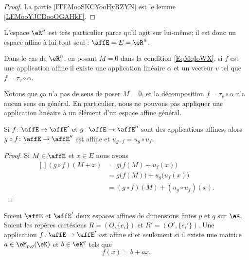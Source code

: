 \begin{proof}
	La partie \ref{ITEMooSKCYooHyRZYN} est le lemme \ref{LEMooYJCDooOGAHkF}.
\end{proof}

\begin{example}     \label{EXooAGINooYmvPML}
	L'espace \( \eR^n\) est très particulier parce qu'il agit sur lui-même; il est donc un espace affine à lui tout seul : \( \affE=E=\eR^n\).

	Dans le cas de \( \eR^n\), en posant \( M=0\) dans la condition \eqref{EqMqIoWX}, si \( f\) est une application affine il existe une application linéaire \( \alpha\) et un vecteur \( v\) tel que \( f=\tau_v\circ \alpha\).

	Notons que ça n'a pas de sens de poser \( M=0\), et la décomposition \( f=\tau_v\circ \alpha\) n'a aucun sens en général. En particulier, nous ne pouvons pas appliquer une application linéaire à un élément d'un espace affine général.
\end{example}

\begin{proposition}
	Si \( f\colon \affE\to \affE'\) et \( g\colon \affE\to \affE''\) sont des applications affines, alors \( g\circ f\colon \affE\to \affE''\) est affine et \( u_{g\circ f}=u_g\circ u_f\).
\end{proposition}

\begin{proof}
	Si \( M\in\affE\) et \( x\in E\) nous avons
	\begin{equation}
		\begin{aligned}[]
			(g\circ f)(M+x) & =g\big( f(M)+u_f(x) \big)                \\
			                & =g\big( f(M) \big)+u_g\big( u_f(x) \big) \\
			                & =(g\circ f)(M)+(u_g\circ u_f)(x).
		\end{aligned}
	\end{equation}
\end{proof}

\begin{theorem}     \label{THOooBAPDooEUtBgF}
	Soient \( \affE\) et \( \affE'\) deux espaces affines de dimensions finies \( p\) et \( q\) sur \( \eK\). Soient les repères cartésiens \( R=(O,\{ e_i \})\) et \( R'=(O',\{ e_i' \})\). Une application \( f\colon \affE\to \affE'\) est affine si et seulement si il existe une matrice \( a\in\eM_{p,q}(\eK)\) et \( b\in \eK^q\) tels que
	\begin{equation}    \label{EqCmNHjs}
		f(x)=b+ax.
	\end{equation}
\end{theorem}

